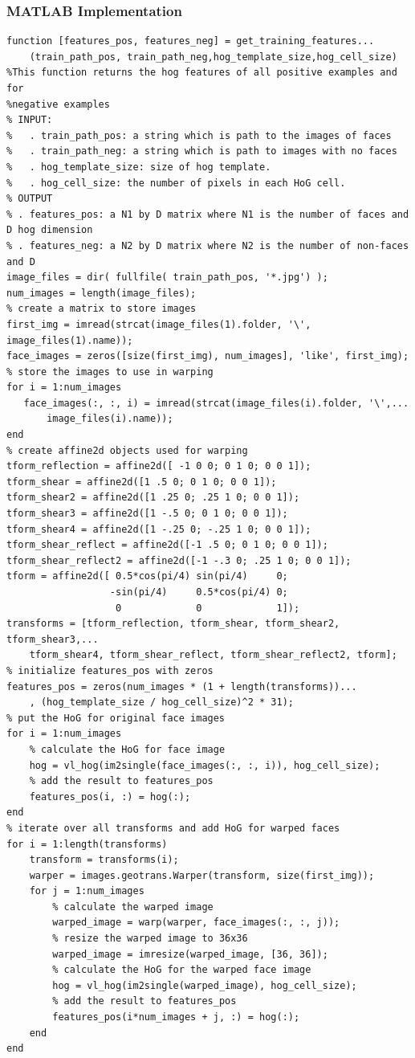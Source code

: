 \documentclass{article}
\begin{document}
\subsubsection{MATLAB Implementation}
\begin{lstlisting}[caption={MATLAB script for processing images taken from LFW database.},captionpos=b]
function [features_pos, features_neg] = get_training_features...
    (train_path_pos, train_path_neg,hog_template_size,hog_cell_size)
%This function returns the hog features of all positive examples and for
%negative examples
% INPUT:
%   . train_path_pos: a string which is path to the images of faces
%   . train_path_neg: a string which is path to images with no faces
%   . hog_template_size: size of hog template.
%   . hog_cell_size: the number of pixels in each HoG cell.
% OUTPUT
% . features_pos: a N1 by D matrix where N1 is the number of faces and D hog dimension
% . features_neg: a N2 by D matrix where N2 is the number of non-faces and D
image_files = dir( fullfile( train_path_pos, '*.jpg') );
num_images = length(image_files);
% create a matrix to store images
first_img = imread(strcat(image_files(1).folder, '\', image_files(1).name));
face_images = zeros([size(first_img), num_images], 'like', first_img); 
% store the images to use in warping
for i = 1:num_images
   face_images(:, :, i) = imread(strcat(image_files(i).folder, '\',...
       image_files(i).name)); 
end
% create affine2d objects used for warping
tform_reflection = affine2d([ -1 0 0; 0 1 0; 0 0 1]);
tform_shear = affine2d([1 .5 0; 0 1 0; 0 0 1]);
tform_shear2 = affine2d([1 .25 0; .25 1 0; 0 0 1]);
tform_shear3 = affine2d([1 -.5 0; 0 1 0; 0 0 1]);
tform_shear4 = affine2d([1 -.25 0; -.25 1 0; 0 0 1]);
tform_shear_reflect = affine2d([-1 .5 0; 0 1 0; 0 0 1]);
tform_shear_reflect2 = affine2d([-1 -.3 0; .25 1 0; 0 0 1]);
tform = affine2d([ 0.5*cos(pi/4) sin(pi/4)     0;
                  -sin(pi/4)     0.5*cos(pi/4) 0;
                   0             0             1]);
transforms = [tform_reflection, tform_shear, tform_shear2, tform_shear3,...
    tform_shear4, tform_shear_reflect, tform_shear_reflect2, tform];
% initialize features_pos with zeros
features_pos = zeros(num_images * (1 + length(transforms))...
    , (hog_template_size / hog_cell_size)^2 * 31);
% put the HoG for original face images 
for i = 1:num_images
    % calculate the HoG for face image
    hog = vl_hog(im2single(face_images(:, :, i)), hog_cell_size);
    % add the result to features_pos
    features_pos(i, :) = hog(:);
end
% iterate over all transforms and add HoG for warped faces
for i = 1:length(transforms)
    transform = transforms(i);
    warper = images.geotrans.Warper(transform, size(first_img));
    for j = 1:num_images
        % calculate the warped image
        warped_image = warp(warper, face_images(:, :, j));
        % resize the warped image to 36x36
        warped_image = imresize(warped_image, [36, 36]);
        % calculate the HoG for the warped face image
        hog = vl_hog(im2single(warped_image), hog_cell_size);
        % add the result to features_pos
        features_pos(i*num_images + j, :) = hog(:);
    end
end
\end{lstlisting}
\end{document}
